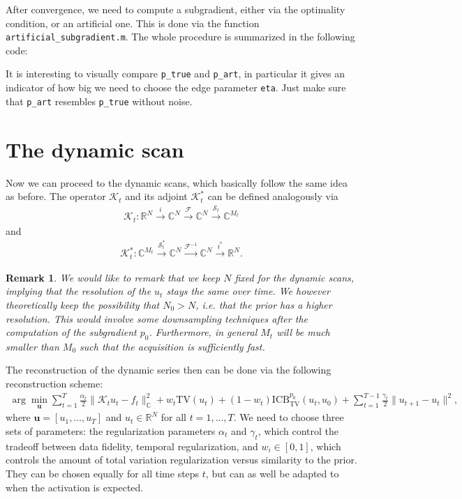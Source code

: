 \documentclass{article}
\newcommand{\mat}[1]{\lstinline[style=Matlab-editor]{#1}}
\newcommand{\TV}{\mathrm{TV}}
\newcommand{\C}{\mathbb{C}}
\newcommand{\R}{\mathbb{R}}
\newcommand{\ICBTV}{\mathrm{ICB}_\TV}
\newcommand{\ubold}{\mathbf{u}}
\newcommand{\Kcal}{\mathcal{K}}
\newcommand{\Fcal}{\mathcal{F}}
\newcommand{\Scal}{\mathcal{S}}
\newtheorem{myrem}{Remark}
\begin{document}
After convergence, we need to compute a subgradient, either via the optimality condition, or an artificial one. 
This is done via the function \mat{artificial_subgradient.m}.
The whole procedure is summarized in the following code: 

%
It is interesting to visually compare \mat{p_true} and \mat{p_art}, in particular it gives an indicator of how big we need to choose the edge parameter \mat{eta}. 
Just make sure that \mat{p_art} resembles \mat{p_true} without noise.


\section{The dynamic scan}  
Now we can proceed to the dynamic scans, which basically follow the same idea as before. 
The operator $\Kcal_t$ and its adjoint $\Kcal_t^*$ can be defined analogously via 
\begin{align}
 \Kcal_t \colon \R^N \xrightarrow{i} \C^N \xrightarrow{\Fcal} \C^N \xrightarrow{\Scal_t} \C^{M_t}
\end{align}
and 
\begin{align}
 \Kcal_t^* \colon \C^{M_t}  \xrightarrow{\Scal_t^*} \C^{N} \xrightarrow{\Fcal^{-1}} \C^N \xrightarrow{i^*} \R^N.
\end{align}
%
\begin{myrem}
 We would like to remark that we keep $N$ fixed for the dynamic scans, implying that the resolution of the $u_t$ stays the same over time. 
 We however theoretically keep the possibility that $N_0 > N$, i.e. that the prior has a higher resolution. 
 This would involve some downsampling techniques after the computation of the subgradient $p_0$.
 Furthermore, in general $M_t$ will be much smaller than $M_0$ such that the acquisition is sufficiently fast.
\end{myrem}
%
The reconstruction of the dynamic series then can be done via the following reconstruction scheme:
\begin{align}
   \arg \min_{\ubold} \sum_{t=1}^T \frac{\alpha_t}{2} \| \Kcal_t u_t - f_t\|_\C^2 + w_t \TV(u_t) + (1-w_t) \ICBTV^{p_0}(u_t, u_0 ) + \sum_{t=1}^{T-1} \frac{\gamma_t}{2} \| u_{t+1} - u_t \|^2,
   \label{eq:jr_fmri}
\end{align}
where $\ubold = [u_1, \dots, u_T]$ and $u_t \in \R^N$ for all $t = 1, \dots, T$.
We need to choose three sets of parameters: the regularization parameters $\alpha_t$ and $\gamma_t$, which control the tradeoff between data fidelity, temporal regularization, and $w_i \in [0,1]$, which controls the amount of total variation regularization versus similarity to the prior. 
They can be chosen equally for all time steps $t$, but can as well be adapted to when the activation is expected.
\end{document}
